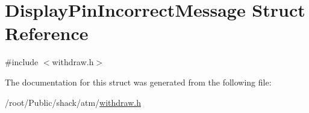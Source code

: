 \hypertarget{structDisplayPinIncorrectMessage}{\section{Display\-Pin\-Incorrect\-Message Struct Reference}
\label{structDisplayPinIncorrectMessage}
}


{\ttfamily \#include $<$withdraw.\-h$>$}



The documentation for this struct was generated from the following file\-:\begin{DoxyCompactItemize}
\item 
/root/\-Public/shack/atm/\hyperlink{withdraw_8h}{withdraw.\-h}\end{DoxyCompactItemize}
